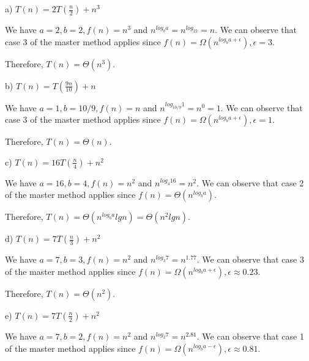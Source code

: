 \documentclass[11pt]{article}
\begin{document}
\begin{flushleft}
   a) $T(n) = 2T(\frac{n}{2}) + n^3$
    \newline

   We have $a = 2, b = 2, f(n) = n^3$ and $n^{log_ba} = n^{log_22}= n$. 
   We can observe that case 3 of the master method applies since $f(n) = \Omega(n^{log_ba+\epsilon}), \epsilon = 3$. 
    \newline

   Therefore, $T(n) = \Theta(n^3)$.
    \newline

    b) $T(n) = T(\frac{9n}{10}) + n$
    \newline

   We have $a = 1, b = 10/9, f(n) = n$ and $n^{log_{10/9}1} = n^0= 1$. 
   We can observe that case 3 of the master method applies since $f(n) = \Omega(n^{log_ba+\epsilon}), \epsilon = 1$. 
    \newline

   Therefore, $T(n) = \Theta(n)$.    
   \newline

    c) $T(n) = 16T(\frac{n}{4}) + n^2$
    \newline

   We have $a = 16, b = 4, f(n) = n^2$ and $n^{log_{4}16} = n^2$. 
   We can observe that case 2 of the master method applies since $f(n) = \Theta(n^{log_ba})$. 
    \newline

   Therefore, $T(n) = \Theta(n^{log_ba}lgn) = \Theta(n^{2}lgn)$.    
   \newline

 d) $T(n) = 7T(\frac{n}{3}) + n^2$
 \newline

We have $a = 7, b = 3, f(n) = n^2$ and $n^{log_{3}7} = n^{1.77}$. 
We can observe that case 3 of the master method applies since $f(n) = \Omega(n^{log_ba+\epsilon}), \epsilon \approx 0.23$. 
 \newline

Therefore, $T(n) = \Theta(n^2)$.    
\newline

 e) $T(n) = 7T(\frac{n}{2}) + n^2$
 \newline

We have $a = 7, b = 2, f(n) = n^2$ and $n^{log_{2}7} = n^{2.81}$. 
We can observe that case 1 of the master method applies since $f(n) = \Omega(n^{log_ba-\epsilon}), \epsilon \approx 0.81$. 
 \newline


\end{flushleft}
\end{document}
